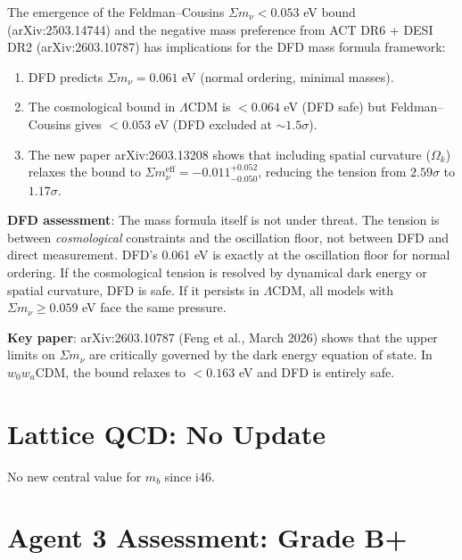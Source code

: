 \documentclass[11pt,a4paper]{article}
\begin{document}
\begin{tcolorbox}[colback=yellow!5!white, colframe=yellow!60!black,
  title={$\Sigma m_\nu$ Tension: Impact on DFD Mass Formula Framework}]

The emergence of the Feldman--Cousins $\Sigma m_\nu < 0.053$ eV bound (arXiv:2503.14744) and the negative mass preference from ACT DR6 + DESI DR2 (arXiv:2603.10787) has implications for the DFD mass formula framework:

\begin{enumerate}
\item DFD predicts $\Sigma m_\nu = 0.061$ eV (normal ordering, minimal masses).
\item The cosmological bound in $\Lambda$CDM is $< 0.064$ eV (DFD safe) but Feldman--Cousins gives $< 0.053$ eV (DFD excluded at $\sim 1.5\sigma$).
\item The new paper arXiv:2603.13208 shows that including spatial curvature ($\Omega_k$) relaxes the bound to $\Sigma m_\nu^{\text{eff}} = -0.011^{+0.052}_{-0.050}$, reducing the tension from $2.59\sigma$ to $1.17\sigma$.
\end{enumerate}

\textbf{DFD assessment}: The mass formula itself is not under threat. The tension is between \emph{cosmological} constraints and the oscillation floor, not between DFD and direct measurement. DFD's 0.061 eV is exactly at the oscillation floor for normal ordering. If the cosmological tension is resolved by dynamical dark energy or spatial curvature, DFD is safe. If it persists in $\Lambda$CDM, all models with $\Sigma m_\nu \geq 0.059$ eV face the same pressure.

\textbf{Key paper}: arXiv:2603.10787 (Feng et al., March 2026) shows that the upper limits on $\Sigma m_\nu$ are critically governed by the dark energy equation of state. In $w_0 w_a$CDM, the bound relaxes to $< 0.163$ eV and DFD is entirely safe.
\end{tcolorbox}

\section{Lattice QCD: No Update}

No new central value for $m_b$ since i46.

\section{Agent 3 Assessment: Grade B+}
\end{document}
